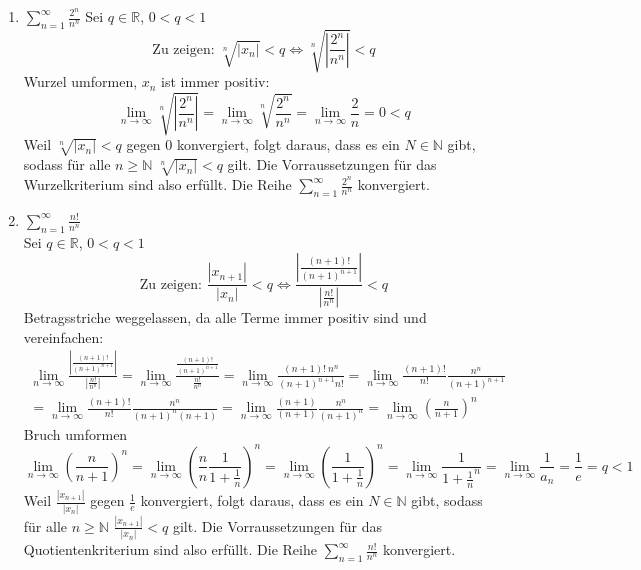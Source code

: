 \documentclass{article}
\begin{document}
\begin{enumerate}[ label= (\roman*) ]
        \item \(\sum_{n=1}^{\infty} \frac{2^n}{n^n}\)
        Sei \(q \in \mathbb{R}\), \(0 < q < 1\) \\
        \[ \text{Zu zeigen: } \sqrt[n]{|x_n|} < q \Leftrightarrow \sqrt[n]{ \left| \frac{2^n}{n^n} \right| } < q \]
        Wurzel umformen, \(x_n\) ist immer positiv:
        \[
            \lim_{n \to \infty} \sqrt[n]{ \left| \frac{2^n}{n^n} \right| } 
            = \lim_{n \to \infty} \sqrt[n]{ \frac{2^n}{n^n} } 
            = \lim_{n \to \infty} \frac{2}{n} = 0 < q
        \]
        Weil \(\sqrt[n]{|x_n|} < q\) gegen \(0\) konvergiert,
        folgt daraus, dass es ein \(N \in \mathbb{N}\) gibt, sodass für alle \(n \geq \mathbb{N} \) \(\sqrt[n]{|x_n|} < q\) gilt.
        Die Vorraussetzungen für das Wurzelkriterium sind also erfüllt.
        Die Reihe \( \sum_{n=1}^{\infty} \frac{2^n}{n^n} \) konvergiert.

        \item \( \sum_{n=1}^{\infty} \frac{n!}{n^n} \) \\
        Sei \(q \in \mathbb{R}\), \(0 < q < 1\) \\
        \[ \text{Zu zeigen: } \frac{|x_{n+1}|}{|x_{n}|} < q \Leftrightarrow  \frac{  \left| \frac{(n+1)!}{{(n+1)}^{n+1}} \right| }{ \left| \frac{n!}{n^n} \right| } < q \]
        Betragsstriche weggelassen, da alle Terme immer positiv sind und vereinfachen:
        \begin{gather*}
            \lim_{n \to \infty} \frac{|\frac{(n+1)!}{{(n+1)}^{n+1}}|}{|\frac{n!}{n^n}|}
            = \lim_{n \to \infty} \frac{\frac{(n+1)!}{{(n+1)}^{n+1}}}{\frac{n!}{n^n}}
            = \lim_{n \to \infty} \frac{(n+1)! \: n^n}{ {(n+1)}^{n+1} n! }
            = \lim_{n \to \infty} \frac{(n+1)!}{n!} \frac{n^n}{{(n+1)}^{n+1}} \\
            = \lim_{n \to \infty} \frac{(n+1)!}{n!} \frac{n^n}{ {(n+1)}^{n} (n+1)}
            = \lim_{n \to \infty} \frac{(n+1)}{(n+1)} \frac{n^n}{{(n+1)}^{n}} 
            = \lim_{n \to \infty} {\left( \frac{n}{n+1} \right)}^n 
        \end{gather*}
        Bruch umformen
        \[
            \lim_{n \to \infty} {\left( \frac{n}{n+1} \right)}^{n} =
            \lim_{n \to \infty} {\left( \frac{n}{n} \frac{1}{1+ \frac{1}{n}} \right)}^{n} =
            \lim_{n \to \infty} {\left( \frac{1}{1+ \frac{1}{n}} \right)}^{n} = 
            \lim_{n \to \infty} \frac{1}{ { 1 + \frac{1}{n} }^{n} } =
            \lim_{n \to \infty} \frac{1}{ a_n } =
            \frac{1}{e} = q < 1
        \]
        Weil \(\frac{|x_{n+1}|}{|x_{n}|}\) gegen \(\frac{1}{e}\) konvergiert,
        folgt daraus, dass es ein \(N \in \mathbb{N}\) gibt, sodass für alle \(n \geq \mathbb{N} \) \(\frac{|x_{n+1}|}{|x_{n}|} < q\) gilt.
        Die Vorraussetzungen für das Quotientenkriterium sind also erfüllt.
        Die Reihe \( \sum_{n=1}^{\infty} \frac{n!}{n^n} \) konvergiert.


\end{enumerate}
\end{document}
